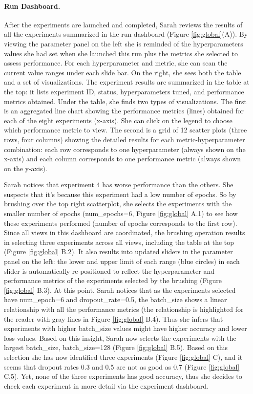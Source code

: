 \documentclass[preprint]{vgtc}        %
\begin{document}
\paragraph{Run Dashboard.} After the experiments are launched and completed, Sarah reviews the results of all the experiments summarized in the run dashboard (Figure \ref{fig:global}(A)). By viewing the parameter panel on the left she is reminded of the hyperparameters values she had set when she launched this run plus the metrics she selected to assess performance. For each hyperparameter and metric, she can scan the current value ranges under each slide bar. On the right, she sees both the table and a set of visualizations. The experiment results are summarized in the table at the top: it lists experiment ID, status, hyperparameters tuned, and performance metrics obtained. Under the table, she finds two types of visualizations. The first is an aggregated line chart showing the performance metrics (lines) obtained for each of the eight experiments (x-axis). She can click on the legend to choose which performance metric to view. The second is a grid of 12 scatter plots (three rows, four columns) showing the detailed results for each metric-hyperparameter combination: each row corresponds to one hyperparameter (always shown on the x-axis) and each column corresponds to one performance metric (always shown on the y-axis).

Sarah notices that experiment 4 has worse performance than the others. She suspects that it's because this experiment had a low number of epochs. So by brushing over the top right scatterplot, she selects the experiments with the smaller number of epochs (num\_epochs=6, Figure \ref{fig:global} A.1) to see how these experiments performed (number of epochs corresponds to the first row). Since all views in this dashboard are coordinated, the brushing operation results in selecting three experiments across all views, including the table at the top (Figure \ref{fig:global} B.2). It also results into updated sliders in the parameter panel on the left: the lower and upper limit of each range (blue circles) in each slider is automatically re-positioned to reflect the hyperparameter and performance metrics of the experiments selected by the brushing (Figure \ref{fig:global} B.3). At this point, Sarah notices that as the experiments selected have num\_epoch=6 and dropout\_rate=0.5, the batch\_size shows a linear relationship with all the performance metrics (the relationship is highlighted for the reader with gray lines in Figure \ref{fig:global} B.4). Thus she infers that experiments with higher batch\_size values might have higher accuracy and lower loss values. Based on this insight, Sarah now selects the experiments with the largest batch\_size, batch\_size=128 (Figure \ref{fig:global} B.5). Based on this selection she has now identified three experiments (Figure \ref{fig:global} C), and it seems that dropout rates 0.3 and 0.5 are not as good as 0.7 (Figure \ref{fig:global} C.5). Yet, none of the three experiments has good accuracy, thus she decides to check each experiment in more detail via the experiment dashboard.
\end{document}
